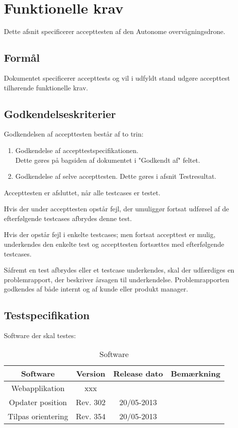 \chapter{Funktionelle krav}
Dette afsnit specificerer accepttesten af den Autonome overvågningsdrone.

\section*{Formål}
Dokumentet specificerer accepttests og vil i udfyldt stand udgøre accepttest tilhørende funktionelle krav. 

\section*{Godkendelseskriterier}
Godkendelsen af accepttesten består af to trin:

\begin{enumerate}
	\item Godkendelse af accepttestspecifikationen. \\
	Dette gøres på bagsiden af dokumentet i "Godkendt af" feltet.

	\item Godkendelse af selve accepttesten. Dette gøres i afsnit Testresultat. 
\end{enumerate}

Accepttesten er afsluttet, når alle testcases er testet.

Hvis der under accepttesten opstår fejl, der umuliggør fortsat udførsel af de efterfølgende testcases afbrydes denne test.

Hvis der opstår fejl i enkelte testcases; men fortsat accepttest er mulig, underkendes den enkelte test og accepttesten fortsættes med efterfølgende testcases.

Såfremt en test afbrydes eller et testcase underkendes, skal der udfærdiges en problemrapport, der beskriver årsagen til underkendelse. Problemrapporten godkendes af både internt og af kunde eller produkt manager.

\newpage

\section*{Testspecifikation}
Software der skal testes:
\begin{table}[H]
	\centering
		\begin{tabular}{|c|c|c|c|}
			\hline
			Software & Version & Release dato & Bemærkning \\ \hline
			Webapplikation & xxx & &\\ \hline
			Opdater position & Rev. 302 & 20/05-2013 & \\ \hline
			Tilpas orientering & Rev. 354 & 20/05-2013 & \\ \hline
		\end{tabular}
	\caption{Software}
\end{table}

